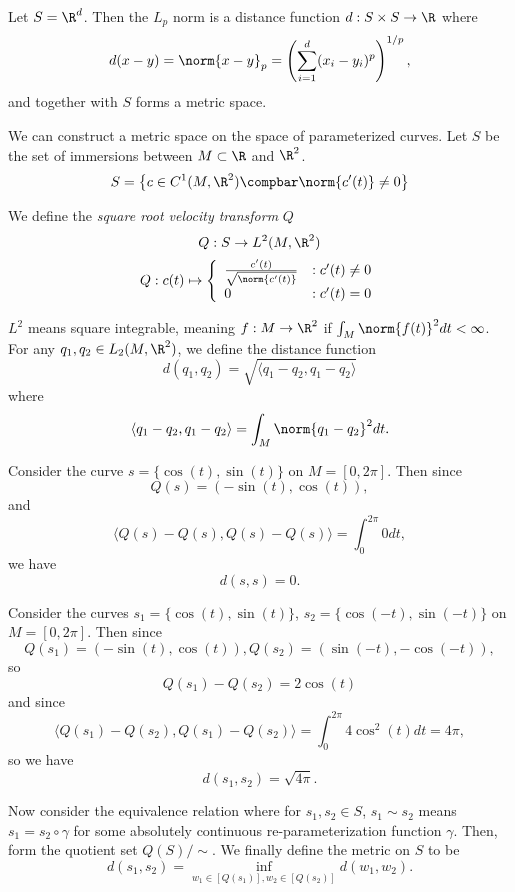 \documentclass[12pt]{article}
\begin{document}
\begin{defn}
    Let $S = \R^d$. Then the $L_p$ norm is a distance function $d: S \times S \to \R$ where \[d(x - y) = \norm{x - y}_p = \left(\sum_{i=1}^d(x_i - y_i)^p\right)^{1/p},\] and together with $S$ forms a metric space.
\end{defn}

We can construct a metric space on the space of parameterized curves. Let $S$ be the set of immersions between $M \subset \R$ and $\R^2$.
\[S = \left\{c \in C^1(M, \R^2) \compbar \norm{c'(t)} \neq 0 \right\}\]

We define the \emph{square root velocity transform} $Q$
\[Q: S \to L^2(M, \R^2)\]
\[Q: c(t) \mapsto \left\{
    \begin{array}{ll}
        \frac{c'(t)}{\sqrt{\norm{c'(t)}}} & : c'(t) \neq 0\\
        0 & : c'(t) = 0\\
    \end{array}
  \right.
\]

$L^2$ means square integrable, meaning $f: M \to \R^2$ if $\int_M \norm{f(t)}^2dt < \infty$. For any $q_1, q_2 \in L_2(M, \R^2)$, we define the distance function
\[d(q_1, q_2) = \sqrt{\langle q_1 - q_2, q_1 - q_2\rangle}\] where
\[\langle q_1 - q_2, q_1 - q_2 \rangle = \int_M\norm{q_1 - q_2}^2dt.\]

\begin{exmp}
    Consider the curve $s = \{\cos(t), \sin(t)\}$ on $M = [0, 2\pi]$. Then since
    \[Q(s) = \left(-\sin(t), \cos(t)\right),\] and
    \[\langle Q(s) - Q(s), Q(s) - Q(s) \rangle = \int_0^{2\pi} 0dt,\] we have
    \[d(s, s) = 0.\]
\end{exmp}

\begin{exmp}
    Consider the curves $s_1 = \{\cos(t), \sin(t)\}$, $s_2 = \{\cos(-t), \sin(-t)\}$ on $M = [0, 2\pi]$. Then since
    \[Q(s_1) = \left(-\sin(t), \cos(t)\right), Q(s_2) = \left(\sin(-t), -\cos(-t)\right),\] so
    \[Q(s_1) - Q(s_2) = 2\cos(t)\] and since
    \[\langle Q(s_1) - Q(s_2), Q(s_1) - Q(s_2) \rangle = \int_0^{2\pi}{4\cos^2(t)}dt = 4\pi,\] so we have
    \[d(s_1, s_2) = \sqrt{4\pi}.\]
\end{exmp}

Now consider the equivalence relation where for $s_1, s_2 \in S$, $s_1 \sim s_2$ means $s_1 = s_2 \circ \gamma$ for some absolutely continuous re-parameterization function $\gamma$. Then, form the quotient set $Q(S)/\sim$. We finally define the metric on $S$ to be
\[d(s_1, s_2) = \inf_{w_1\in[Q(s_1)],w_2\in[Q(s_2)]}d(w_1,w_2).\]
\end{document}
